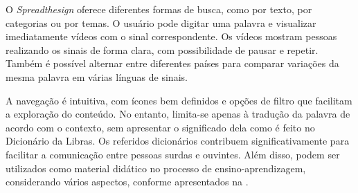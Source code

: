 \documentclass[portuguese]{textolivre}
\begin{document}
O \textit{Spreadthesign} oferece diferentes formas de busca, como por texto, por categorias ou por temas. O usuário pode digitar uma palavra e visualizar imediatamente vídeos com o sinal correspondente. Os vídeos mostram pessoas realizando os sinais de forma clara, com possibilidade de pausar e repetir. Também é possível alternar entre diferentes países para comparar variações da mesma palavra em várias línguas de sinais.

A navegação é intuitiva, com ícones bem definidos e opções de filtro que facilitam a exploração do conteúdo. No entanto, limita-se apenas à tradução da palavra de acordo com o contexto, sem apresentar o significado dela como é feito no Dicionário da Libras. Os referidos dicionários contribuem significativamente para facilitar a comunicação entre pessoas surdas e ouvintes. Além disso, podem ser utilizados como material didático no processo de ensino-aprendizagem, considerando vários aspectos, conforme apresentados na .
\end{document}
